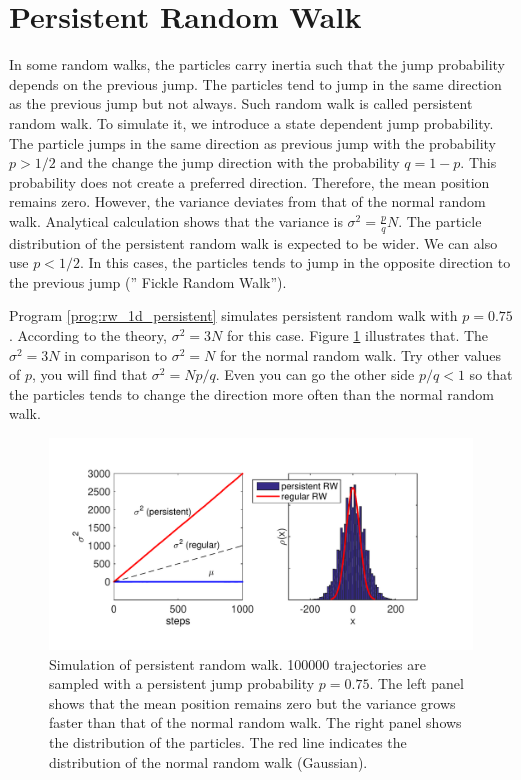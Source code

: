 \noindent
\section{Persistent Random Walk}

In some random walks, the particles carry inertia such that the jump probability depends on the previous jump.  The particles tend to jump in the same direction as the previous jump but not always.  Such random walk is called persistent random walk.  To simulate it, we introduce a state dependent jump probability.  The particle jumps in the same direction as previous jump with the probability $p>1/2$ and the change the jump direction with the probability $q=1-p$.  This probability does not create a  preferred direction.  Therefore, the mean position remains zero.
However, the variance deviates from that of the normal random walk. Analytical calculation shows that the variance is $\sigma^2=\frac{p}{q}N$. The particle distribution of the persistent random walk is expected to be wider.  We can also use $p<1/2$.  In this cases, the particles tends to jump in the opposite direction to the previous jump ('' Fickle Random Walk'').

\bigskip

\begin{example}

Program \ref{prog:rw_1d_persistent} simulates persistent random walk with $p=0.75$. According to the theory, $\sigma^2 = 3N$ for this case.  Figure \ref{fig:rw_1d_persistent} illustrates that. The $\sigma^2 = 3 N$ in comparison to $\sigma^2 = N$ for the normal random walk.  Try other values of $p$, you will find that $\sigma^2 = N p/q$. Even you can go the other side $p/q<1$ so that the particles tends to change the direction more often than the normal random walk.

\begin{figure}
\centering
\includegraphics[width=5.0in]{16.Random-Walk/persistent_rw.pdf}
\caption{Simulation of persistent random walk. 100000 trajectories are sampled with a persistent jump probability $p=0.75$.  The left panel shows that the mean position remains zero but the variance grows faster than that of the normal random walk.  The right panel shows the distribution of the particles.  The red line indicates the distribution of the normal random walk (Gaussian).}
\label{fig:rw_1d_persistent}
\end{figure}

\end{example}

